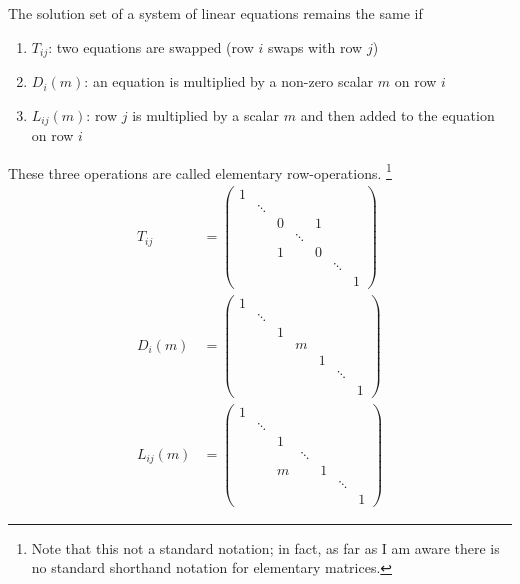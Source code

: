 \begin{definition}\label{def-elementary-matrices}
	The solution set of a system of linear equations remains the same if
	\begin{enumerate}
		\item $T_{ij}$: two equations are swapped (row $i$ swaps with row $j$)
		\item $D_i(m)$: an equation is multiplied by a non-zero scalar $m$ on row $i$
		\item $L_{ij}(m)$: row $j$ is multiplied by a scalar $m$ and then added
		      to the equation on row $i$
	\end{enumerate}
	These three operations are called elementary row-operations.
	\footnote{Note that this not a standard notation; in fact, as far as I am
		aware there is no standard shorthand notation for elementary matrices.}
	\begin{align}
		T_{ij}    & = \begin{pmatrix}
			1 &        &   &        &   &        &   \\
			  & \ddots &   &        &   &        &   \\
			  &        & 0 &        & 1 &        &   \\
			  &        &   & \ddots &   &        &   \\
			  &        & 1 &        & 0 &        &   \\
			  &        &   &        &   & \ddots &   \\
			  &        &   &        &   &        & 1
		\end{pmatrix}\label{eq-row-swap}            \\
		D_i(m)    & = \begin{pmatrix}
			1 &        &   &   &   &        &   \\
			  & \ddots &   &   &   &        &   \\
			  &        & 1 &   &   &        &   \\
			  &        &   & m &   &        &   \\
			  &        &   &   & 1 &        &   \\
			  &        &   &   &   & \ddots &   \\
			  &        &   &   &   &        & 1
		\end{pmatrix}\label{eq-row-multiplication} \\
		L_{ij}(m) & = \begin{pmatrix}
			1 &        &   &        &   &        &   \\
			  & \ddots &   &        &   &        &   \\
			  &        & 1 &        &   &        &   \\
			  &        &   & \ddots &   &        &   \\
			  &        & m &        & 1 &        &   \\
			  &        &   &        &   & \ddots &   \\
			  &        &   &        &   &        & 1
		\end{pmatrix}\label{eq-row-addition}
	\end{align}
\end{definition}

